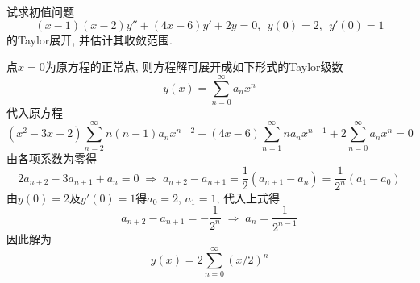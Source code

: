 \begin{problem}[习题4.2]
试求初值问题
\[
(x-1)(x-2)y''+(4x-6)y'+2y=0,\:\:
y(0)=2,\:\: y'(0)=1
\]
的Taylor展开, 并估计其收敛范围.
\end{problem}

\begin{solution}
点$x=0$为原方程的正常点, 则方程解可展开成如下形式的Taylor级数
\[
y(x)=\sum_{n=0}^{\infty}a_{n}x^{n}
\]
代入原方程
\[
(x^{2}-3x+2)\sum_{n=2}^{\infty}n(n-1)a_{n}x^{n-2}+(4x-6)\sum_{n=1}^{\infty}na_{n}x^{n-1}+2\sum_{n=0}^{\infty}a_{n}x^{n}=0
\]
由各项系数为零得
\[
2a_{n+2}-3a_{n+1}+a_{n}=0\;\Longrightarrow\; a_{n+2}-a_{n+1}=\frac{1}{2}(a_{n+1}-a_{n})=\frac{1}{2^{n}}(a_{1}-a_{0})
\]
由$y(0)=2$及$y'(0)=1$得$a_{0}=2$, $a_{1}=1$, 代入上式得
\[
a_{n+2}-a_{n+1}=-\frac{1}{2^{n}}\;\Longrightarrow\; a_{n}=\frac{1}{2^{n-1}}
\]
因此解为
\[
y(x)=2\sum_{n=0}^{\infty}(x/2)^{n}
\]
\end{solution}
